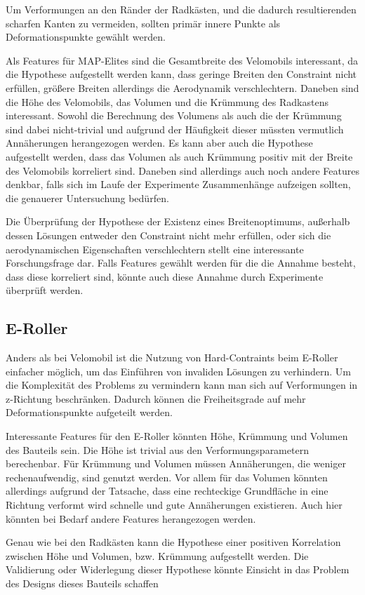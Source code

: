 \documentclass[12pt]{article}
\begin{document}
Um Verformungen an den Ränder der Radkästen, und die dadurch resultierenden scharfen Kanten zu vermeiden, sollten primär innere Punkte als Deformationspunkte gewählt werden.

Als Features für MAP-Elites sind die Gesamtbreite des Velomobils interessant, da die Hypothese aufgestellt werden kann, dass geringe Breiten den Constraint nicht erfüllen, größere Breiten allerdings die Aerodynamik verschlechtern.
Daneben sind die Höhe des Velomobils, das Volumen und die Krümmung des Radkastens interessant.
Sowohl die Berechnung des Volumens als auch die der Krümmung sind dabei nicht-trivial und aufgrund der Häufigkeit dieser müssten vermutlich Annäherungen herangezogen werden.
Es kann aber auch die Hypothese aufgestellt werden, dass das Volumen als auch Krümmung positiv mit der Breite des Velomobils korreliert sind.
Daneben sind allerdings auch noch andere Features denkbar, falls sich im Laufe der Experimente Zusammenhänge aufzeigen sollten, die genauerer Untersuchung bedürfen.

Die Überprüfung der Hypothese der Existenz eines Breitenoptimums, außerhalb dessen Lösungen entweder den Constraint nicht mehr erfüllen, oder sich die aerodynamischen Eigenschaften verschlechtern stellt eine interessante Forschungsfrage dar.
Falls Features gewählt werden für die die Annahme besteht, dass diese korreliert sind, könnte auch diese Annahme durch Experimente überprüft werden.

\subsection{E-Roller}
Anders als bei Velomobil ist die Nutzung von Hard-Contraints beim E-Roller einfacher möglich, um das Einführen von invaliden Lösungen zu verhindern.
Um die Komplexität des Problems zu vermindern kann man sich auf Verformungen in z-Richtung beschränken.
Dadurch können die Freiheitsgrade auf mehr Deformationspunkte aufgeteilt werden.

Interessante Features für den E-Roller könnten Höhe, Krümmung und Volumen des Bauteils sein.
Die Höhe ist trivial aus den Verformungsparametern berechenbar.
Für Krümmung und Volumen müssen Annäherungen, die weniger rechenaufwendig, sind genutzt werden.
Vor allem für das Volumen könnten allerdings aufgrund der Tatsache, dass eine rechteckige Grundfläche in eine Richtung verformt wird schnelle und gute Annäherungen existieren.
Auch hier könnten bei Bedarf andere Features herangezogen werden.

Genau wie bei den Radkästen kann die Hypothese einer positiven Korrelation zwischen Höhe und Volumen, bzw. Krümmung aufgestellt werden.
Die Validierung oder Widerlegung dieser Hypothese könnte Einsicht in das Problem des Designs dieses Bauteils schaffen
\end{document}
